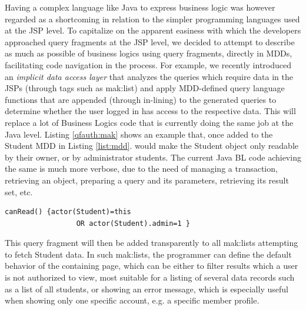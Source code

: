 \documentclass{chi2009}
\begin{document}
Having a complex language like Java to express business logic was however regarded as a shortcoming in relation to the simpler programming languages used at the JSP level. To capitalize on the apparent easiness with which the developers approached query fragments at the JSP level, we decided to attempt to describe as much as possible of business logics using query fragments, directly in MDDs, facilitating code navigation in the process. For example, we recently introduced an \textit{implicit data access layer} that analyzes the queries which require data in the JSPs (through tags such as mak:list) and apply MDD-defined query language functions that are appended (through in-lining)  to the generated queries to determine whether the user logged in has access to the respective data. This will replace a lot of Business Logics code that is currently doing the same job at the Java level. Listing \ref{qfauth:mak} shows an example that, once added to the Student MDD in Listing \ref{list:mdd}. would make the Student object only readable by their owner, or by administrator students. The current Java BL code achieving the same is much more verbose, due to the need of managing a transaction, retrieving an object, preparing a query and its parameters, retrieving its result set, etc.
\lstset{basicstyle=\small, captionpos=b, caption= query fragment authorization rule, label=qfauth:mak, frame=shadowbox}
\begin{lstlisting}
canRead() {actor(Student)=this 
                 OR actor(Student).admin=1 }
\end{lstlisting}
This query fragment will then be added transparently to all mak:lists attempting to fetch Student data. In such mak:lists, the programmer can define the default behavior of the containing page, which can be either to filter results which a user is not authorized to view, most suitable for a listing of several data records such as a list of all students, or showing an error message, which is especially useful when showing only one specific account, e.g. a specific member profile.
\end{document}

